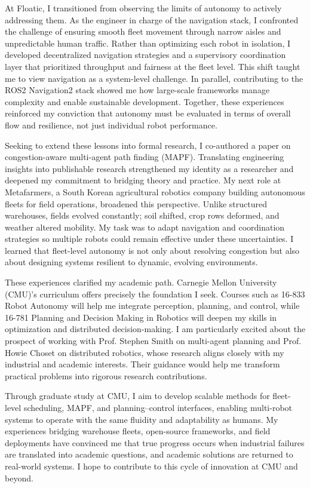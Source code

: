 \documentclass[12pt]{article}
\begin{document}
\vspace{0.5em}
At Floatic, I transitioned from observing the limits of autonomy to actively addressing them. As the engineer in charge of the navigation stack, I confronted the challenge of ensuring smooth fleet movement through narrow aisles and unpredictable human traffic. Rather than optimizing each robot in isolation, I developed decentralized navigation strategies and a supervisory coordination layer that prioritized throughput and fairness at the fleet level. This shift taught me to view navigation as a system-level challenge. In parallel, contributing to the ROS2 Navigation2 stack showed me how large-scale frameworks manage complexity and enable sustainable development. Together, these experiences reinforced my conviction that autonomy must be evaluated in terms of overall flow and resilience, not just individual robot performance.

\vspace{0.5em}
Seeking to extend these lessons into formal research, I co-authored a paper on congestion-aware multi-agent path finding (MAPF). Translating engineering insights into publishable research strengthened my identity as a researcher and deepened my commitment to bridging theory and practice. My next role at Metafarmers, a South Korean agricultural robotics company building autonomous fleets for field operations, broadened this perspective. Unlike structured warehouses, fields evolved constantly; soil shifted, crop rows deformed, and weather altered mobility. My task was to adapt navigation and coordination strategies so multiple robots could remain effective under these uncertainties. I learned that fleet-level autonomy is not only about resolving congestion but also about designing systems resilient to dynamic, evolving environments.

\vspace{0.5em}
These experiences clarified my academic path. Carnegie Mellon University (CMU)’s curriculum offers precisely the foundation I seek. Courses such as 16-833 Robot Autonomy will help me integrate perception, planning, and control, while 16-781 Planning and Decision Making in Robotics will deepen my skills in optimization and distributed decision-making. I am particularly excited about the prospect of working with Prof. Stephen Smith on multi-agent planning and Prof. Howie Choset on distributed robotics, whose research aligns closely with my industrial and academic interests. Their guidance would help me transform practical problems into rigorous research contributions.

\vspace{0.5em}
Through graduate study at CMU, I aim to develop scalable methods for fleet-level scheduling, MAPF, and planning–control interfaces, enabling multi-robot systems to operate with the same fluidity and adaptability as humans. My experiences bridging warehouse fleets, open-source frameworks, and field deployments have convinced me that true progress occurs when industrial failures are translated into academic questions, and academic solutions are returned to real-world systems. I hope to contribute to this cycle of innovation at CMU and beyond.
\end{document}
